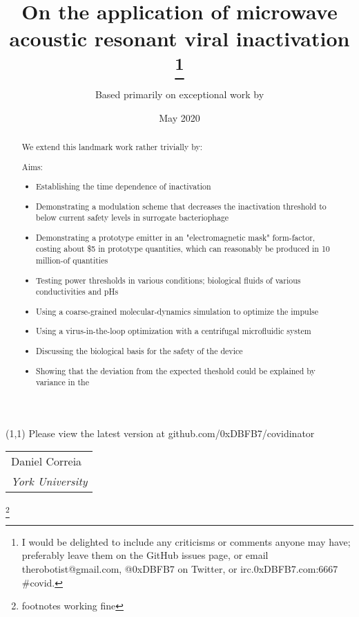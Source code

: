 \documentclass[fleqn,10pt]{article}
\title{On the application of microwave acoustic resonant viral inactivation
\thanks{I would be delighted to include any criticisms or comments anyone may have; preferably leave them on the GitHub issues page, or email therobotist@gmail.com, @0xDBFB7 on Twitter, or irc.0xDBFB7.com:6667 \#covid.}}
\date{May 2020}
\author{Based primarily on exceptional work by }
\begin{document}
\flushbottom 
\maketitle
\thispagestyle{empty}




\begin{textblock}{5}(1,1)
\noindent Please view the latest version at github.com/0xDBFB7/covidinator
\end{textblock}

\null\begin{tabular}[t]{l@{}}
  {Daniel Correia} \\
  \textit{York University}
\end{tabular}



\begin{abstract}

We extend this landmark work rather trivially by:


Aims:

\begin{itemize}
  \item Establishing the time dependence of inactivation
  \item Demonstrating a modulation scheme that decreases the inactivation threshold to below current safety levels in surrogate bacteriophage
  \item Demonstrating a prototype emitter in an "electromagnetic mask" form-factor, costing about \$5 in prototype quantities, which can reasonably be produced in 10 million-of quantities
  \item Testing power thresholds in various conditions; biological fluids of various conductivities and pHs
  \item Using a coarse-grained molecular-dynamics simulation to optimize the impulse
  \item Using a virus-in-the-loop optimization with a centrifugal microfluidic system
  \item Discussing the biological basis for the safety of the device
  \item Showing that the deviation from the expected theshold could be explained by variance in the 
\end{itemize}
\end{abstract}


\footnote{footnotes working fine}
\end{document}
